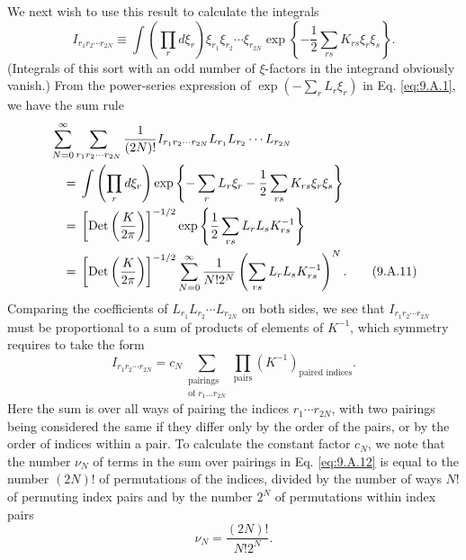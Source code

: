 We next wish to use this result to calculate the integrals
\begin{equation}
  I_{r_1r_2\cdots r_{2N}}\equiv
  \int\left(\prod_r d\xi_r\right)\xi_{r_1}\xi_{r_2}\cdots\xi_{r_{2N}}
  \exp\left\{-\frac{1}{2}\sum_{rs}K_{rs}\xi_r\xi_s\right\}.
  \tag{9.A.10}\label{eq:9.A.10}
\end{equation}
(Integrals of this sort with an odd number of $\xi$-factors in the integrand
obviously vanish.) From the power-series expression of
$\exp(-\sum_rL_r\xi_r)$ in Eq. \eqref{eq:9.A.1}, we have the sum rule
\begin{align}
  &\sum_{N=0}^{\infty}\sum_{r_1r_2\cdots r_{2N}}
  \frac{1}{(2N)!}I_{r_1r_2\cdots r_{2N}}
  L_{r_1}L_{r_2}\cdots L_{r_{2N}}
  \notag\\
  &\quad={}
  \int\left(\prod_r d\xi_r\right)
  \exp\left\{-\sum_rL_r\xi_r-\frac{1}{2}\sum_{rs}K_{rs}\xi_r\xi_s\right\}
  \notag\\
  &\quad={}
  \left[\operatorname{Det}\left(\frac{K}{2\pi}\right)\right]^{-1/2}
  \exp\left\{\frac{1}{2}\sum_{rs}L_rL_sK^{-1}_{rs}\right\}
  \notag\\
  &\quad={}
  \left[\operatorname{Det}\left(\frac{K}{2\pi}\right)\right]^{-1/2}
  \sum_{N=0}^{\infty}\frac{1}{N!2^N}
  \left(\sum_{rs}L_rL_sK^{-1}_{rs}\right)^N.
  \tag{9.A.11}\label{eq:9.A.11}
\end{align}
Comparing the coefficients of $L_{r_1}L_{r_2}\cdots L_{r_{2N}}$ on both
sides, we see that $I_{r_1r_2\cdots r_{2N}}$ must be proportional to a sum
of products of elements of $K^{-1}$, which symmetry requires to take the
form
\begin{equation}
  I_{r_1r_2\cdots r_{2N}}
  =c_N\sum_{\substack{\text{pairings}\\\text{of }r_1\ldots r_{2N}}}
  \prod_{\text{pairs}}(K^{-1})_{\text{paired indices}}.
  \tag{9.A.12}\label{eq:9.A.12}
\end{equation}
Here the sum is over all ways of pairing the indices $r_1\cdots r_{2N}$,
with two pairings being considered the same if they differ only by the order
of the pairs, or by the order of indices within a pair. To calculate the
constant factor $c_N$, we note that the number $\nu_N$ of terms in the sum
over pairings in Eq. \eqref{eq:9.A.12} is equal to the number $(2N)!$ of permutations
of the indices, divided by the number of ways $N!$ of permuting index pairs
and by the number $2^N$ of permutations within index pairs
\begin{equation}
  \nu_N=\frac{(2N)!}{N!2^N}.
  \tag{9.A.13}\label{eq:9.A.13}
\end{equation}
